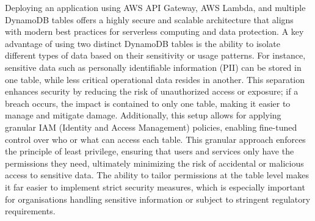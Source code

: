 Deploying an application using AWS API Gateway, AWS Lambda, and multiple DynamoDB tables offers a highly secure and scalable architecture that aligns with modern best practices for serverless computing and data protection. A key advantage of using two distinct DynamoDB tables is the ability to isolate different types of data based on their sensitivity or usage patterns. For instance, sensitive data such as personally identifiable information (PII) can be stored in one table, while less critical operational data resides in another. This separation enhances security by reducing the risk of unauthorized access or exposure; if a breach occurs, the impact is contained to only one table, making it easier to manage and mitigate damage. Additionally, this setup allows for applying granular IAM (Identity and Access Management) policies, enabling fine-tuned control over who or what can access each table. This granular approach enforces the principle of least privilege, ensuring that users and services only have the permissions they need, ultimately minimizing the risk of accidental or malicious access to sensitive data. The ability to tailor permissions at the table level makes it far easier to implement strict security measures, which is especially important for organisations handling sensitive information or subject to stringent regulatory requirements.



